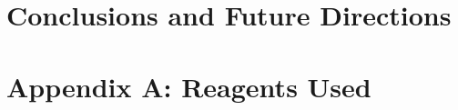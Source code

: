 \documentclass[PhD]{dukethesis2006}
\begin{document}
\begin{doublespace}

\end{doublespace}

\chapter{Conclusions and Future Directions}

\begin{doublespace}

\end{doublespace}

\chapter{Appendix A: Reagents Used}

\begin{doublespace}

\end{doublespace}

%
%

%
%
\end{document}

